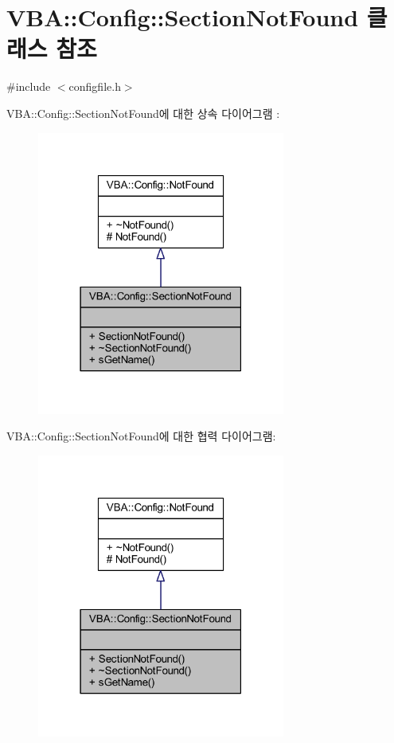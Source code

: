 \hypertarget{class_v_b_a_1_1_config_1_1_section_not_found}{}\section{V\+BA\+:\+:Config\+:\+:Section\+Not\+Found 클래스 참조}
\label{class_v_b_a_1_1_config_1_1_section_not_found}


{\ttfamily \#include $<$configfile.\+h$>$}



V\+BA\+:\+:Config\+:\+:Section\+Not\+Found에 대한 상속 다이어그램 \+: \nopagebreak
\begin{figure}[H]
\begin{center}
\leavevmode
\includegraphics[width=231pt]{class_v_b_a_1_1_config_1_1_section_not_found__inherit__graph}
\end{center}
\end{figure}


V\+BA\+:\+:Config\+:\+:Section\+Not\+Found에 대한 협력 다이어그램\+:\nopagebreak
\begin{figure}[H]
\begin{center}
\leavevmode
\includegraphics[width=231pt]{class_v_b_a_1_1_config_1_1_section_not_found__coll__graph}
\end{center}
\end{figure}
